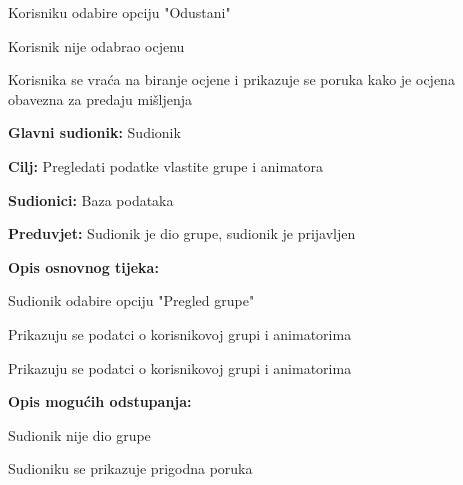 \begin{packed_item}
\begin{packed_item}
\begin{packed_enum}
								\item Korisniku odabire opciju "Odustani"

							\end{packed_enum}
							\item[4.a] Korisnik nije odabrao ocjenu
							\item[] \begin{packed_enum}
								
								\item Korisnika se vraća na biranje ocjene i prikazuje se poruka kako je ocjena obavezna za predaju mišljenja
								
							\end{packed_enum}
						\end{packed_item}
					\end{packed_item}
					
					\noindent {}
					\begin{packed_item}
						
						\item \textbf{Glavni sudionik: }Sudionik
						\item  \textbf{Cilj:} Pregledati podatke vlastite grupe i animatora
						\item  \textbf{Sudionici:} Baza podataka
						\item  \textbf{Preduvjet:} Sudionik je dio grupe, sudionik je prijavljen
						\item  \textbf{Opis osnovnog tijeka:}
						
						\item[] \begin{packed_enum}
							
							\item Sudionik odabire opciju "Pregled grupe"
							\item Prikazuju se podatci o korisnikovoj grupi i animatorima
							\item Prikazuju se podatci o korisnikovoj grupi i animatorima
						\end{packed_enum}
						
						\item  \textbf{Opis mogućih odstupanja:}
						
						\item[] \begin{packed_item}
							
							\item[2.a] Sudionik nije dio grupe
							\item[] \begin{packed_enum}
								
								\item Sudioniku se prikazuje prigodna poruka
								
							\end{packed_enum}
							
						\end{packed_item}
					\end{packed_item}
				
